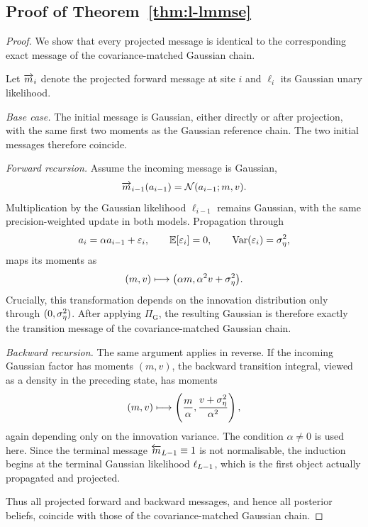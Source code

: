 \subsection{Proof of Theorem~\ref{thm:l-lmmse}}
\label{sec:lmmse-proof}

\begin{proof}
We show that every projected message is identical to the corresponding exact
message of the covariance-matched Gaussian chain.

Let $\overrightarrow{m}_i$ denote the projected forward message at site $i$ and $\ell_i$
its Gaussian unary likelihood.

\emph{Base case.}
The initial message is Gaussian, either directly or after projection, with the
same first two moments as the Gaussian reference chain. The two initial
messages therefore coincide.

\emph{Forward recursion.}
Assume the incoming message is Gaussian,
\[
  \overrightarrow{m}_{i-1}(a_{i-1})=\mathcal{N}(a_{i-1};m,v).
\]
Multiplication by the Gaussian likelihood $\ell_{i-1}$ remains Gaussian, with
the same precision-weighted update in both models. Propagation through
\[
  a_i=\alpha a_{i-1}+\varepsilon_i,
  \qquad
  \mathbb{E}[\varepsilon_i]=0,
  \qquad
  \operatorname{Var}(\varepsilon_i)=\sigma_\eta^2,
\]
maps its moments as
\begin{equation}
  (m,v)
  \longmapsto
  \bigl(\alpha m,\alpha^2v+\sigma_\eta^2\bigr).
  \label{eq:lmmse-fwd-map}
\end{equation}
Crucially, this transformation depends on the innovation distribution only
through $(0,\sigma_\eta^2)$. After applying $\Pi_{\mathrm G}$, the resulting Gaussian
is therefore exactly the transition message of the covariance-matched
Gaussian chain.

\emph{Backward recursion.}
The same argument applies in reverse. If the incoming Gaussian factor has
moments $(m,v)$, the backward transition integral, viewed as a density in the
preceding state, has moments
\begin{equation}
  (m,v)
  \longmapsto
  \left(\frac{m}{\alpha},
        \frac{v+\sigma_\eta^2}{\alpha^2}\right),
  \label{eq:lmmse-bwd-map}
\end{equation}
again depending only on the innovation variance. The condition
$\alpha\neq0$ is used here. Since the terminal message
$\overleftarrow{m}_{L-1}\equiv1$ is not normalisable, the induction begins at the
terminal Gaussian likelihood $\ell_{L-1}$, which is the first object
actually propagated and projected.

Thus all projected forward and backward messages, and hence all posterior
beliefs, coincide with those of the covariance-matched Gaussian chain.


\end{proof}

